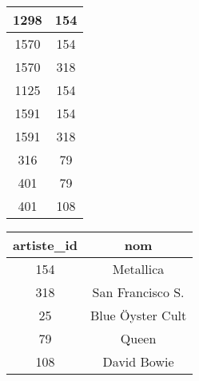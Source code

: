 \documentclass[article,a4paper,firamath,12pt]{nsi}
\begin{document}
\begin{center}
\begin{tabular}{|c|c|}
        \hline
        1298                                                  & 154                               \\
        \hline
        1570                                                  & 154                               \\
        \hline
        1570                                                  & 318                               \\
        \hline
        1125                                                  & 154                               \\
        \hline
        1591                                                  & 154                               \\
        \hline
        1591                                                  & 318                               \\
        \hline
        316                                                   & 79                                \\
        \hline
        401                                                   & 79                                \\
        \hline
        401                                                   & 108                               \\
        \hline
    \end{tabular}	\hspace*{1em}
    \begin{tabular}{|c|c|}
        \hline
        \rowcolor{UGLiOrange} \color{white}\textbf{artiste\_id} & \color{white}\textbf{nom}     \\
        \hline
        \color{white} 154                                       & Metallica                     \\
        \hline
        318                                                     & \color{white}San Francisco S. \\
        \hline
        25                                                      & \color{white}Blue Öyster Cult \\
        \hline
        79                                                      & \color{white} Queen           \\
        \hline
        108                                                     & \color{white} David Bowie     \\
        \hline
    \end{tabular}
\end{center}
\end{document}

